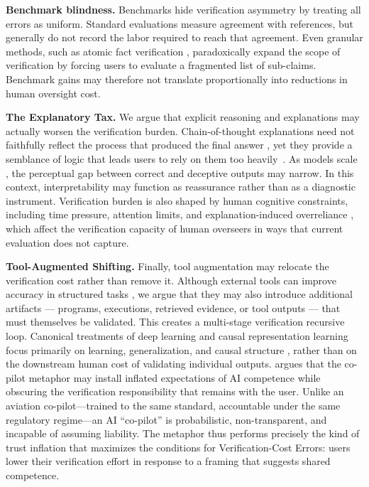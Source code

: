 \documentclass[11pt]{article}
\newcommand{\cfix}[1]{\textcolor{green!50!black}{#1}}
\newcommand{\viola}[1]{\textcolor[HTML]{7030A0}{#1}}
\newcommand{\cfix}[1]{#1}
\newcommand{\viola}[1]{#1}
\begin{document}
\textbf{Benchmark blindness.} Benchmarks {hide} verification asymmetry by treating all errors as uniform. Standard evaluations measure agreement with references, \citep{liang2023helm, kiela2021dynabench} {but generally do not record the labor required to reach that agreement}.
Even granular methods, such as atomic fact verification \citep{min2023factscore}, paradoxically expand the {scope of} verification by forcing users to {evaluate} a {fragmented} list of sub-claims.
{Benchmark gains may therefore not translate proportionally into reductions in human oversight cost.}

\textbf{The Explanatory Tax.} We argue that explicit reasoning and explanations may actually worsen the verification burden. \cfix{Chain-of-thought explanations need not faithfully reflect the process that produced the final answer \citep{dziri2023faithful},}
{yet they provide a semblance of logic that leads users to rely on them too heavily}~\citep{bansal2021does}.
{As models scale \citep{kaplan2020scaling, wei2022emergent, bubeck2023sparks}, the perceptual gap between correct and deceptive outputs may narrow.} In this {context}, \viola{interpretability may function as reassurance rather than as a diagnostic instrument.}
{Verification burden is also shaped by human cognitive constraints, including time pressure, attention limits, and \cfix{explanation-induced overreliance} \citep{bansal2021does}, which affect the verification capacity of human overseers in ways that current evaluation does not capture.}

\textbf{Tool-Augmented Shifting.} \viola{Finally, tool augmentation may relocate the verification cost rather than remove it.}
\cfix{Although external tools can improve accuracy in structured tasks \citep{gao2023pal}, we argue that they may also introduce additional artifacts --- programs, executions, retrieved evidence, or tool outputs --- that must themselves be validated.}
This creates a multi-stage verification recursive loop. \cfix{Canonical treatments of deep learning and causal representation learning focus primarily on learning, generalization, and causal structure \citep{goodfellow2016deep, scholkopf2021causal}, rather than on the downstream human cost of validating individual outputs.}
\cite{Immediato2025-POM} argues that the co-pilot metaphor may install inflated expectations of AI competence while obscuring the verification responsibility that remains with the user. Unlike an aviation co-pilot—trained to the same standard, accountable under the same regulatory regime—an AI ``co-pilot'' is probabilistic, non-transparent, and incapable of assuming liability.
The metaphor thus performs precisely the kind of trust inflation that maximizes the conditions for Verification-Cost Errors: users lower their verification effort in response to a framing that suggests shared competence.
\end{document}
